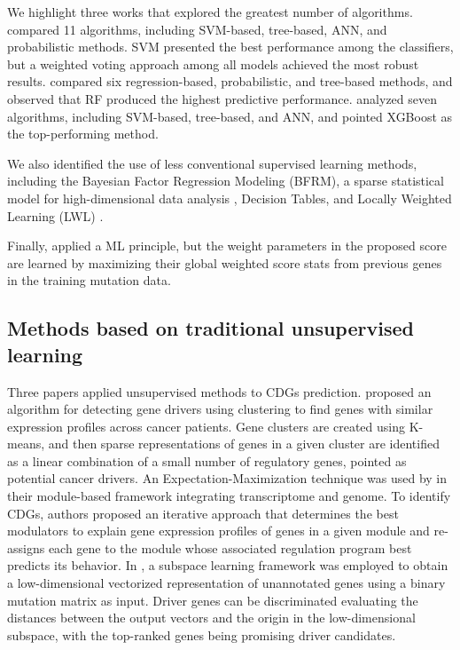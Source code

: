 We highlight three works that explored the greatest number of algorithms. \citet{U2014} compared 11 algorithms, including SVM-based, tree-based, ANN, and probabilistic methods. SVM presented the best performance among the classifiers, but a weighted voting approach among all models achieved the most robust results. \citet{Schroeder2014} compared six regression-based, probabilistic, and tree-based methods, and observed that RF produced the highest predictive performance. \citet{Wang2020} analyzed seven algorithms, including SVM-based, tree-based, and ANN, and pointed XGBoost as the top-performing method. 

We also identified the use of less conventional supervised learning methods, including the Bayesian Factor Regression Modeling (BFRM), a sparse statistical model for high-dimensional data analysis \cite{Fu2012}, Decision Tables, and Locally Weighted Learning (LWL) \cite{U2014}.

Finally, \citet{Han2019} applied a ML principle, but the weight parameters in the proposed score are learned by maximizing their global weighted score stats from previous genes in the training mutation data. 

\subsection{Methods based on traditional unsupervised learning}

Three papers applied unsupervised methods to CDGs prediction. \citet{Manolakos2014} proposed an algorithm for detecting gene drivers using clustering to find genes with similar expression profiles across cancer patients. Gene clusters are created using K-means, and then sparse representations of genes in a given cluster are identified as a linear combination of a small number of regulatory genes, pointed as potential cancer drivers. An Expectation-Maximization technique was used by \citet{Lu2018} in their module-based framework integrating transcriptome and genome. To identify CDGs, authors proposed an iterative approach that determines the best modulators to explain gene expression profiles of genes in a given module and re-assigns each gene to the module whose associated regulation program best predicts its behavior. In \citet{Xi2019}, a subspace learning framework was employed to obtain a low-dimensional vectorized representation of unannotated genes using a binary mutation matrix as input. Driver genes can be discriminated evaluating the distances between the output vectors and the origin in the low-dimensional subspace, with the top-ranked genes being promising driver candidates. 


